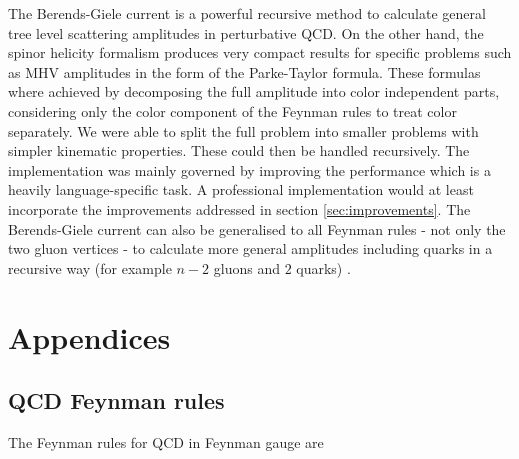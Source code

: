 \documentclass{article}
\theoremstyle{definition}
\numberwithin{equation}{section}
\begin{document}
The Berends-Giele current is a powerful recursive method to calculate general tree level scattering amplitudes in perturbative QCD. On the other hand, the spinor helicity formalism produces very compact results for specific problems such as MHV amplitudes in the form of the Parke-Taylor formula. These formulas where achieved by decomposing the full amplitude into color independent parts, considering only the color component of the Feynman rules to treat color separately. We were able to split the full problem into smaller problems with simpler kinematic properties. These could then be handled recursively.
The implementation was mainly governed by improving the performance which is a heavily language-specific task. A professional implementation would at least incorporate the improvements addressed in section \ref{sec:improvements}. The Berends-Giele current can also be generalised to all Feynman rules - not only the two gluon vertices - to calculate more general amplitudes including quarks in a recursive way (for example $n-2$ gluons and $2$ quarks) \cite{badger2013}.

\newpage




\newpage

\appendix
\section*{Appendices}
\renewcommand{\thesubsection}{\Alph{subsection}}

\subsection{QCD Feynman rules}
\label{sec:frules}

The Feynman rules for QCD in Feynman gauge are \cite{mangano99}
\end{document}
